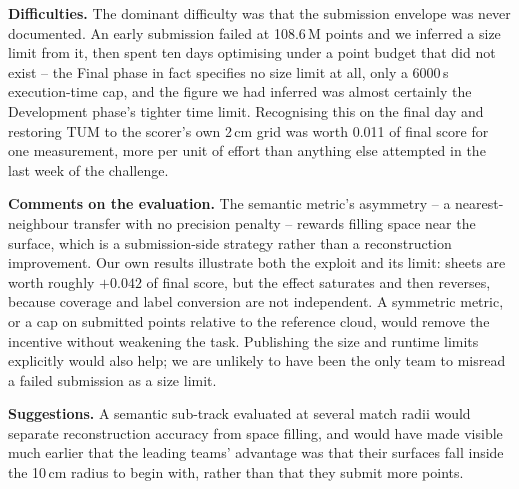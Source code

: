 \documentclass[10pt,twocolumn,letterpaper]{article}
\begin{document}
\textbf{Difficulties.} The dominant difficulty was that the submission envelope
was never documented. An early submission failed at 108.6\,M points and we
inferred a size limit from it, then spent ten days optimising under a point
budget that did not exist -- the Final phase in fact specifies no size limit at
all, only a 6000\,s execution-time cap, and the figure we had inferred was
almost certainly the Development phase's tighter time limit. Recognising this on
the final day and restoring TUM to the scorer's own 2\,cm grid was worth 0.011 of
final score for one measurement, more per unit of effort than anything else
attempted in the last week of the challenge.

\textbf{Comments on the evaluation.} The semantic metric's asymmetry -- a
nearest-neighbour transfer with no precision penalty -- rewards filling space
near the surface, which is a submission-side strategy rather than a
reconstruction improvement. Our own results illustrate both the exploit and its
limit: sheets are worth roughly $+0.042$ of final score, but the effect saturates
and then reverses, because coverage and label conversion are not independent. A
symmetric metric, or a cap on submitted points relative to the reference cloud,
would remove the incentive without weakening the task. Publishing the size and
runtime limits explicitly would also help; we are unlikely to have been the only
team to misread a failed submission as a size limit.

\textbf{Suggestions.} A semantic sub-track evaluated at several match radii would
separate reconstruction accuracy from space filling, and would have made visible
much earlier that the leading teams' advantage was that their surfaces fall
inside the 10\,cm radius to begin with, rather than that they submit more points.

{\small


}
\end{document}
